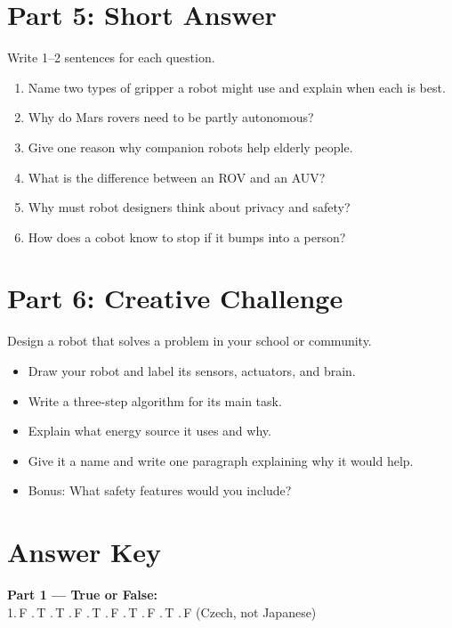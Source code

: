 \sectionrule

\section*{Part 5: Short Answer}

Write 1--2 sentences for each question.

\begin{enumerate}
  \item Name two types of gripper a robot might use and explain when each is best.
  \item Why do Mars rovers need to be partly autonomous?
  \item Give one reason why companion robots help elderly people.
  \item What is the difference between an ROV and an AUV?
  \item Why must robot designers think about privacy and safety?
  \item How does a cobot know to stop if it bumps into a person?
\end{enumerate}

\sectionrule

\section*{Part 6: Creative Challenge}

Design a robot that solves a problem in your school or community.

\begin{itemize}
  \item Draw your robot and label its sensors, actuators, and brain.
  \item Write a three-step algorithm for its main task.
  \item Explain what energy source it uses and why.
  \item Give it a name and write one paragraph explaining why it would help.
  \item Bonus: What safety features would you include?
\end{itemize}

\sectionrule

\section*{Answer Key}

\textbf{Part 1 --- True or False:}\\
1.\,F .\,T .\,T .\,F .\,T .\,F .\,T .\,F .\,T .\,F (Czech, not Japanese)

